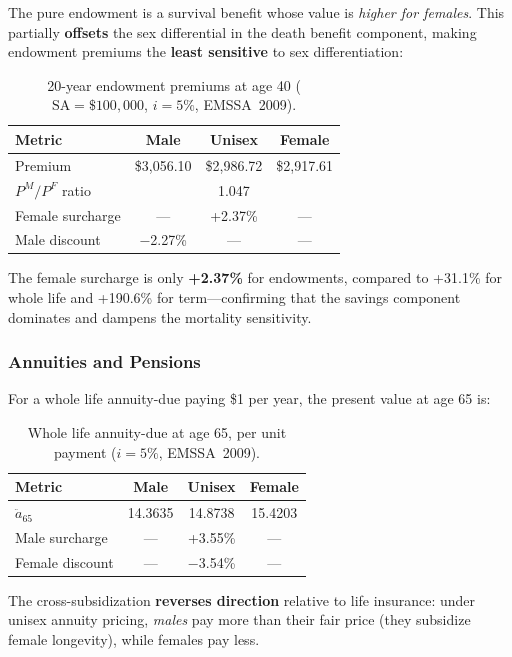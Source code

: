 \documentclass[12pt,a4paper]{article}
\newcommand{\ax}[1]{\ddot{a}_{#1}}
\newcommand{\SA}{\text{SA}}
\begin{document}
The pure endowment is a survival benefit whose value is \emph{higher for females}.
This partially \textbf{offsets} the sex differential in the death benefit component,
making endowment premiums the \textbf{least sensitive} to sex differentiation:

\begin{table}[H]
\centering
\caption{20-year endowment premiums at age 40 ($\SA = \$100{,}000$, $i = 5\%$,
EMSSA~2009).}
\label{tab:endowment-premiums}
\begin{tabular}{lccc}
\toprule
\textbf{Metric} & \textbf{Male} & \textbf{Unisex} & \textbf{Female} \\
\midrule
Premium & \$3,056.10 & \$2,986.72 & \$2,917.61 \\
$P^M/P^F$ ratio & \multicolumn{3}{c}{1.047} \\
Female surcharge & --- & +2.37\% & --- \\
Male discount & $-$2.27\% & --- & --- \\
\bottomrule
\end{tabular}
\end{table}

The female surcharge is only \textbf{+2.37\%} for endowments, compared to
+31.1\% for whole life and +190.6\% for term---confirming that the savings
component dominates and dampens the mortality sensitivity.

\subsubsection{Annuities and Pensions}

For a whole life annuity-due paying \$1 per year, the present value at age 65 is:

\begin{table}[H]
\centering
\caption{Whole life annuity-due at age 65, per unit payment ($i = 5\%$,
EMSSA~2009).}
\label{tab:annuity}
\begin{tabular}{lccc}
\toprule
\textbf{Metric} & \textbf{Male} & \textbf{Unisex} & \textbf{Female} \\
\midrule
$\ax{65}$ & 14.3635 & 14.8738 & 15.4203 \\
Male surcharge & --- & +3.55\% & --- \\
Female discount & --- & $-$3.54\% & --- \\
\bottomrule
\end{tabular}
\end{table}

The cross-subsidization \textbf{reverses direction} relative to life insurance:
under unisex annuity pricing, \emph{males} pay more than their fair price
(they subsidize female longevity), while females pay less.
\end{document}
